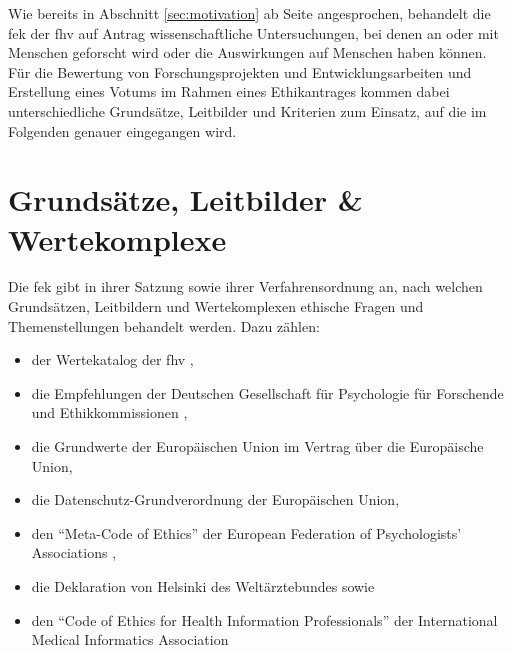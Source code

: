 \documentclass[a4paper,12pt,twoside]{scrreprt}
\begin{document}
Wie bereits in Abschnitt \ref{sec:motivation} ab Seite \pageref{chap:einleitung} angesprochen, behandelt die \acl{fek} der \acl{fhv} auf Antrag wissenschaftliche Untersuchungen, bei denen an oder mit Menschen geforscht wird oder die Auswirkungen auf Menschen haben können. \cite{fachhochschule_vorarlberg_gmbh_forschungsethik-kommission_2021} Für die Bewertung von Forschungsprojekten und Entwicklungsarbeiten und Erstellung eines Votums im Rahmen eines Ethikantrages kommen dabei unterschiedliche Grundsätze, Leitbilder und Kriterien zum Einsatz, auf die im Folgenden genauer eingegangen wird.

\section{Grundsätze, Leitbilder \& Wertekomplexe}
\label{sec:grundsätze-leitbilder-wertekomplexe}

Die \ac{fek} gibt in ihrer Satzung \cite[1]{forschungsethik-kommission_der_fachhochschule_vorarlberg_satzung_2021} sowie ihrer Verfahrensordnung \cite[1\psq]{forschungsethik-kommission_der_fachhochschule_vorarlberg_verfahrensordnung_2020} an, nach welchen Grundsätzen, Leitbildern und Wertekomplexen ethische Fragen und Themenstellungen behandelt werden. Dazu zählen:
\begin{itemize}
    \item der Wertekatalog der \acl{fhv} \cite{kollegium_der_fachhochschule_vorarlberg_gmbh_wertekatalog_2022},
    \item die Empfehlungen der Deutschen Gesellschaft für Psychologie für Forschende und Ethikkommissionen \cite{deutsche_gesellschaft_fur_psychologie_ev_ethisches_2018},
    \item die Grundwerte der Europäischen Union im Vertrag über die Europäische Union,
    \item die Datenschutz-Grundverordnung der Europäischen Union,
    \item den \enquote{Meta-Code of Ethics} der European Federation of Psychologists' Associations \cite{european_federation_of_psychologists_associations_meta-code_2005},
    \item die Deklaration von Helsinki des Weltärztebundes \cite{world_medical_association_world_2013} sowie
    \item den \enquote{Code of Ethics for Health Information Professionals} der International Medical Informatics Association \cite{international_medical_informatics_association_imia_2016}
\end{itemize}
\end{document}
